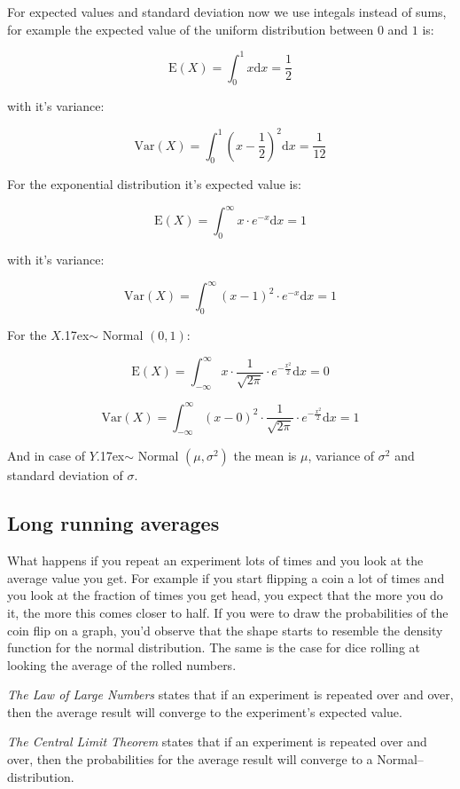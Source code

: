 For expected values and standard deviation now we use integals instead of sums,
for example the expected value of the uniform distribution between $0$ and $1$
is:

\[ \mbox{E}(X) = \int_{0}^{1}x\mbox{d}x = \frac{1}{2}  \]

with it's variance:

\[ \mbox{Var}(X) = \int_{0}^{1}\left(x - \frac{1}{2}\right)^2\mbox{d}x =
\frac{1}{12}
\]

For the exponential distribution it's expected value is:

\[ \mbox{E}(X) = \int_{0}^{\infty}x\cdot e^{-x}\mbox{d}x = 1  \]

with it's variance:

\[ \mbox{Var}(X) = \int_{0}^{\infty}\left(x - 1\right)^2\cdot e^{-x}\mbox{d}x =
1 \]

For the $X ${\raise.17ex\hbox{$\scriptstyle\mathtt{\sim}$}} Normal $(0,1)$: 

\[ \mbox{E}(X)  = \int_{-\infty}^{\infty}x \cdot \frac{1}{\sqrt{2\pi}}
\cdot e^{-\frac{x^2}{2}} \mbox{d}x = 0 
\]

\[ \mbox{Var}(X)  = \int_{-\infty}^{\infty} \left(x - 0\right)^2 \cdot
\frac{1}{\sqrt{2\pi}} \cdot e^{-\frac{x^2}{2}}\mbox{d}x = 1 
\]

And in case of $Y ${\raise.17ex\hbox{$\scriptstyle\mathtt{\sim}$}} Normal
$(\mu,\sigma^2)$ the mean is $\mu$, variance of $\sigma^2$ and standard
deviation of $\sigma$.

\subsection{Long running averages} 

What happens if you repeat an experiment lots of times and you look at the
average value you get. For example if you start flipping a coin a lot of times
and you look at the fraction of times you get head, you expect that the more you
do it, the more this comes closer to half. If you were to draw the probabilities
of the coin flip on a graph, you'd observe that the shape starts to resemble the
density function for the normal distribution. The same is the case for dice
rolling at looking the average of the rolled numbers.

\emph{The Law of Large Numbers} states that if an experiment is repeated over
and over, then the average result will converge to the experiment's expected value.

\emph{The Central Limit Theorem} states that if an experiment is repeated over
and over, then the probabilities for the average result will converge to a
Normal--distribution.

